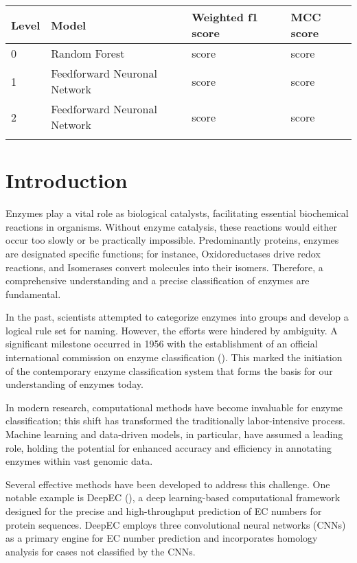 \documentclass{bioinfo}
\begin{document}
\begin{table}[!htbp]
 {\begin{tabular}{@{}llll@{}}\toprule 
		Level &  Model & Weighted f1 score & MCC score\\\midrule
		0 & Random Forest & score & score\\
		1 &  Feedforward Neuronal Network & score & score \\
		2 &  Feedforward Neuronal Network & score & score\\\botrule
\end{tabular}}{}
\end{table}

\section{Introduction}

Enzymes play a vital role as biological catalysts, facilitating essential biochemical reactions in organisms.
Without enzyme catalysis, these reactions would either occur too slowly or be practically impossible.
Predominantly proteins, enzymes are designated specific functions; for instance, Oxidoreductases drive redox reactions, and Isomerases convert molecules into their isomers.
Therefore, a comprehensive understanding and a precise classification of enzymes are fundamental.

In the past, scientists attempted to categorize enzymes into groups and develop a logical rule set for naming.
However, the efforts were hindered by ambiguity.
A significant milestone occurred in 1956 with the establishment of an official international commission on enzyme classification (\cite{IUBMB}).
This marked the initiation of the contemporary enzyme classification system that forms the basis for our understanding of enzymes today.

In modern research, computational methods have become invaluable for enzyme classification; this shift has transformed the traditionally labor-intensive process.
Machine learning and data-driven models, in particular, have assumed a leading role, holding the potential for enhanced accuracy and efficiency in annotating enzymes within vast genomic data.

Several effective methods have been developed to address this challenge.
One notable example is DeepEC (\cite{DeepEC}), a deep learning-based computational framework designed for the precise and high-throughput prediction of EC numbers for protein sequences.
DeepEC employs three convolutional neural networks (CNNs) as a primary engine for EC number prediction and incorporates homology analysis for cases not classified by the CNNs.
\end{document}
